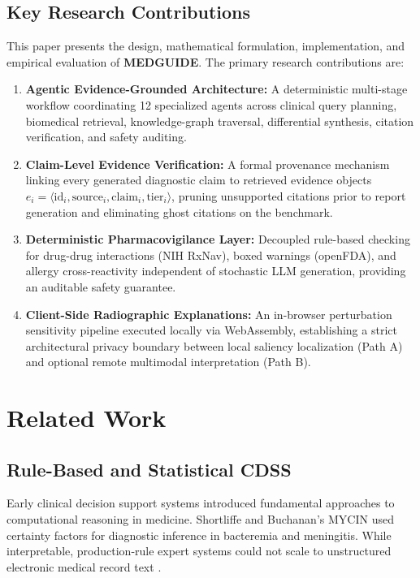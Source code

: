 \documentclass[journal,10pt,twocolumn]{IEEEtran}
\begin{document}
\subsection{Key Research Contributions}
This paper presents the design, mathematical formulation, implementation, and empirical evaluation of \textbf{MEDGUIDE}. The primary research contributions are:
\begin{enumerate}
    \item \textbf{Agentic Evidence-Grounded Architecture:} A deterministic multi-stage workflow coordinating 12 specialized agents across clinical query planning, biomedical retrieval, knowledge-graph traversal, differential synthesis, citation verification, and safety auditing.
    \item \textbf{Claim-Level Evidence Verification:} A formal provenance mechanism linking every generated diagnostic claim to retrieved evidence objects $e_i = \langle \text{id}_i, \text{source}_i, \text{claim}_i, \text{tier}_i \rangle$, pruning unsupported citations prior to report generation and eliminating ghost citations on the benchmark.
    \item \textbf{Deterministic Pharmacovigilance Layer:} Decoupled rule-based checking for drug-drug interactions (NIH RxNav), boxed warnings (openFDA), and allergy cross-reactivity independent of stochastic LLM generation, providing an auditable safety guarantee.
    \item \textbf{Client-Side Radiographic Explanations:} An in-browser perturbation sensitivity pipeline executed locally via WebAssembly, establishing a strict architectural privacy boundary between local saliency localization (Path A) and optional remote multimodal interpretation (Path B).
\end{enumerate}

\section{Related Work}

\subsection{Rule-Based and Statistical CDSS}
Early clinical decision support systems introduced fundamental approaches to computational reasoning in medicine. Shortliffe and Buchanan's MYCIN \cite{shortliffe1975mycin} used certainty factors for diagnostic inference in bacteremia and meningitis. While interpretable, production-rule expert systems could not scale to unstructured electronic medical record text \cite{bates2003ten}.
\end{document}
